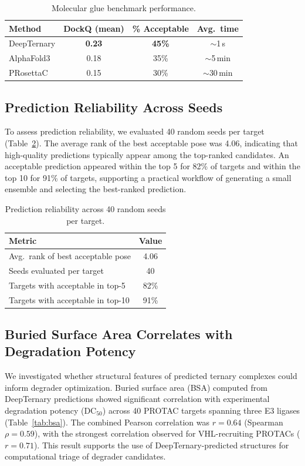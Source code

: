 \documentclass[11pt]{article}
\begin{document}
\begin{table}[h]
\centering
\caption{Molecular glue benchmark performance.}
\label{tab:mg}
\begin{tabular}{lccc}
\toprule
Method & DockQ (mean) & \% Acceptable & Avg.\ time \\
\midrule
DeepTernary & \textbf{0.23} & \textbf{45\%} & $\sim$1\,s \\
AlphaFold3 & 0.18 & 35\% & $\sim$5\,min \\
PRosettaC & 0.15 & 30\% & $\sim$30\,min \\
\bottomrule
\end{tabular}
\end{table}

\subsection{Prediction Reliability Across Seeds}

To assess prediction reliability, we evaluated 40 random seeds per target (Table~\ref{tab:seeds}). The average rank of the best acceptable pose was 4.06, indicating that high-quality predictions typically appear among the top-ranked candidates. An acceptable prediction appeared within the top 5 for 82\% of targets and within the top 10 for 91\% of targets, supporting a practical workflow of generating a small ensemble and selecting the best-ranked prediction.

\begin{table}[h]
\centering
\caption{Prediction reliability across 40 random seeds per target.}
\label{tab:seeds}
\begin{tabular}{lc}
\toprule
Metric & Value \\
\midrule
Avg.\ rank of best acceptable pose & 4.06 \\
Seeds evaluated per target & 40 \\
Targets with acceptable in top-5 & 82\% \\
Targets with acceptable in top-10 & 91\% \\
\bottomrule
\end{tabular}
\end{table}

\subsection{Buried Surface Area Correlates with Degradation Potency}

We investigated whether structural features of predicted ternary complexes could inform degrader optimization. Buried surface area (BSA) computed from DeepTernary predictions showed significant correlation with experimental degradation potency (DC$_{50}$) across 40 PROTAC targets spanning three E3 ligases (Table~\ref{tab:bsa}). The combined Pearson correlation was $r = 0.64$ (Spearman $\rho = 0.59$), with the strongest correlation observed for VHL-recruiting PROTACs ($r = 0.71$). This result supports the use of DeepTernary-predicted structures for computational triage of degrader candidates.
\end{document}
